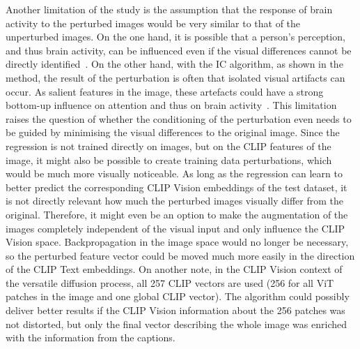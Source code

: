 Another limitation of the study is the assumption that the response of brain activity to the perturbed images would be very similar to that of the unperturbed images. On the one hand, it is possible that a person's perception, and thus brain activity, can be influenced even if the visual differences cannot be directly identified~\cite{rensinkVisualSensingSeeing2004}. On the other hand, with the IC algorithm, as shown in the method, the result of the perturbation is often that isolated visual artifacts can occur. As salient features in the image, these artefacts could have a strong bottom-up influence on attention and thus on brain activity~\cite{wolfeFiveFactorsThat2017}. This limitation raises the question of whether the conditioning of the perturbation even needs to be guided by minimising the visual differences to the original image. Since the regression is not trained directly on images, but on the CLIP features of the image, it might also be possible to create training data perturbations, which would be much more visually noticeable. As long as the regression can learn to better predict the corresponding CLIP Vision embeddings of the test dataset, it is not directly relevant how much the perturbed images visually differ from the original. Therefore, it might even be an option to make the augmentation of the images completely independent of the visual input and only influence the CLIP Vision space. Backpropagation in the image space would no longer be necessary, so the perturbed feature vector could be moved much more easily in the direction of the CLIP Text embeddings. On another note, in the CLIP Vision context of the versatile diffusion process, all 257 CLIP vectors are used (256 for all ViT patches in the image and one global CLIP vector). The algorithm could possibly deliver better results if the CLIP Vision information about the 256 patches was not distorted, but only the final vector describing the whole image was enriched with the information from the captions. 


